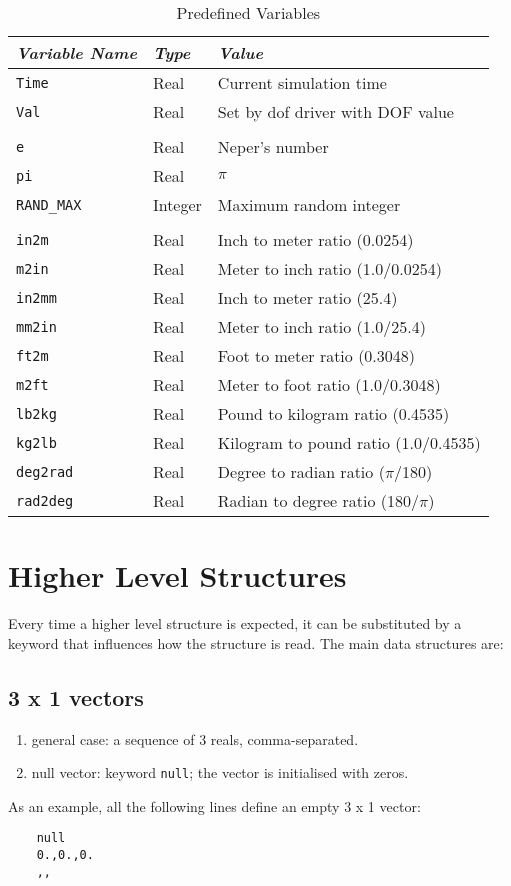 \begin{table}
	\begin{center}
	\caption{Predefined Variables}\label{tab:MATHP-VARS}
	\begin{tabular}{lll}
		\hline
		\emph{Variable Name} & \emph{Type} & \emph{Value} \\
		\hline
		\texttt{Time} & Real & Current simulation time \\
		\texttt{Val} & Real & Set by dof driver with DOF value \\
		\\
		\texttt{e} & Real & Neper's number \\
		\texttt{pi} & Real & $\pi$ \\
		\texttt{RAND\_MAX} & Integer & Maximum random integer \\
		\\
		\texttt{in2m} & Real & Inch to meter ratio (0.0254) \\
		\texttt{m2in} & Real & Meter to inch ratio (1.0/0.0254) \\
		\texttt{in2mm} & Real & Inch to meter ratio (25.4) \\
		\texttt{mm2in} & Real & Meter to inch ratio (1.0/25.4) \\
		\texttt{ft2m} & Real & Foot to meter ratio (0.3048) \\
		\texttt{m2ft} & Real & Meter to foot ratio (1.0/0.3048) \\
		\texttt{lb2kg} & Real & Pound to kilogram ratio (0.4535) \\
		\texttt{kg2lb} & Real & Kilogram to pound ratio (1.0/0.4535) \\
		\texttt{deg2rad} & Real & Degree to radian ratio ($\pi$/180) \\
		\texttt{rad2deg} & Real & Radian to degree ratio (180/$\pi$) \\
		\hline
	\end{tabular}
	\end{center}
\end{table}



\section{Higher Level Structures}
Every time a higher level structure is expected, it can be
substituted by a keyword that influences how the structure is read.
The main data structures are:
\subsection{3 x 1 vectors}
\begin{enumerate}
    \item general case: a sequence of 3 reals, comma-separated.
    \item null vector: keyword \texttt{null}; the vector is initialised
    with zeros.
\end{enumerate}
As an example, all the following lines define an empty 3 x 1 vector:
\begin{verbatim}
    null
    0.,0.,0.
    ,,
\end{verbatim} 
